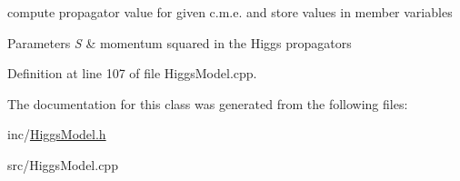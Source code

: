 compute propagator value for given c.\+m.\+e. and store values in member variables 


\begin{DoxyParams}{Parameters}
{\em S} & momentum squared in the Higgs propagators \\
\hline
\end{DoxyParams}


Definition at line 107 of file Higgs\+Model.\+cpp.



The documentation for this class was generated from the following files\+:\begin{DoxyCompactItemize}
\item 
inc/\hyperlink{HiggsModel_8h}{Higgs\+Model.\+h}\item 
src/Higgs\+Model.\+cpp\end{DoxyCompactItemize}
